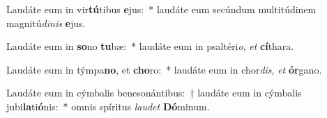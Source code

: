 \item Laudáte eum in vir\textbf{tú}tibus \textbf{e}jus:~* laudáte eum secúndum multitúdinem magnitú\textit{di}\textit{nis} \textbf{e}jus.
\item Laudáte eum in \textbf{so}no \textbf{tu}bæ:~* laudáte eum in psaltéri\textit{o}, \textit{et} \textbf{cí}thara.
\item Laudáte eum in týmpa\textbf{no}, et \textbf{cho}ro:~* laudáte eum in chor\textit{dis}, \textit{et} \textbf{ór}gano.
\item Laudáte eum in cýmbalis benesonántibus:~† laudáte eum in cýmbalis jubi\textbf{la}ti\textbf{ó}nis:~* omnis spíritus \textit{lau}\textit{det} \textbf{Dó}minum.
